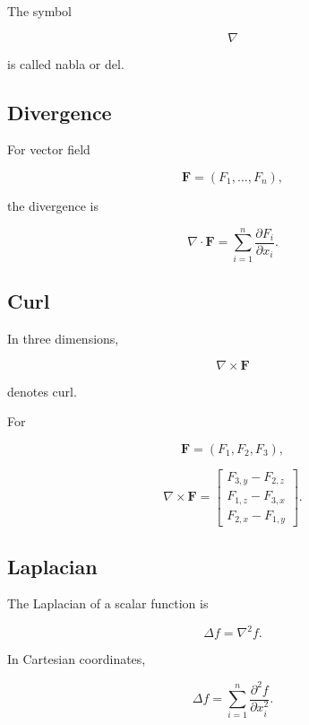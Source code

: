 The symbol

\[
\nabla
\]

is called nabla or del.

\subsection{Divergence}
\label{subsec:divergence-notation-reference}

For vector field

\[
\mathbf{F}
=
(F_1,\ldots,F_n),
\]

the divergence is

\[
\boxed{
\nabla\cdot\mathbf{F}
=
\sum_{i=1}^{n}
\frac{\partial F_i}{\partial x_i}.
}
\]

\subsection{Curl}
\label{subsec:curl-notation-reference}

In three dimensions,

\[
\boxed{
\nabla\times\mathbf{F}
}
\]

denotes curl.

For

\[
\mathbf{F}
=
(F_1,F_2,F_3),
\]

\[
\nabla\times\mathbf{F}
=
\begin{bmatrix}
F_{3,y}-F_{2,z}\\
F_{1,z}-F_{3,x}\\
F_{2,x}-F_{1,y}
\end{bmatrix}.
\]

\subsection{Laplacian}
\label{subsec:laplacian-notation-reference}

The Laplacian of a scalar function is

\[
\boxed{
\Delta f
=
\nabla^2f.
}
\]

In Cartesian coordinates,

\[
\boxed{
\Delta f
=
\sum_{i=1}^{n}
\frac{\partial^2f}{\partial x_i^2}.
}
\]

